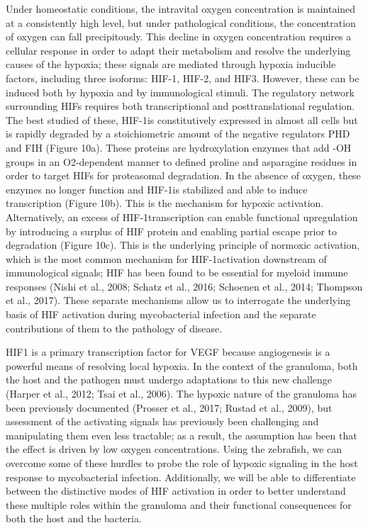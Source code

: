 Under homeostatic conditions, the intravital oxygen concentration is maintained at a consistently high level, but under pathological conditions, the concentration of oxygen can fall precipitously. This decline in oxygen concentration requires a cellular response in order to adapt their metabolism and resolve the underlying causes of the hypoxia; these signals are mediated through hypoxia inducible factors, including three isoforms: HIF-1\textalpha, HIF-2\textalpha, and HIF3\textalpha{}. However, these can be induced both by hypoxia and by immunological stimuli. The regulatory network surrounding HIFs requires both transcriptional and posttranslational regulation. The best studied of these, HIF-1\textalpha is constitutively expressed in almost all cells but is rapidly degraded by a stoichiometric amount of the negative regulators PHD and FIH (Figure 10a). These proteins are hydroxylation enzymes that add -OH groups in an O2-dependent manner to defined proline and asparagine residues in order to target HIFs for proteasomal degradation. In the absence of oxygen, these enzymes no longer function and HIF-1\textalpha is stabilized and able to induce transcription (Figure 10b). This is the mechanism for hypoxic activation. Alternatively, an excess of HIF-1\textalpha transcription can enable functional upregulation by introducing a surplus of HIF protein and enabling partial escape prior to degradation (Figure 10c). This is the underlying principle of normoxic activation, which is the most common mechanism for HIF-1\textalpha activation downstream of immunological signals; HIF has been found to be essential for myeloid immune responses (Nishi et al., 2008; Schatz et al., 2016; Schoenen et al., 2014; Thompson et al., 2017). These separate mechanisms allow us to interrogate the underlying basis of HIF activation during mycobacterial infection and the separate contributions of them to the pathology of disease. 

HIF1\textalpha{} is a primary transcription factor for VEGF because angiogenesis is a powerful means of resolving local hypoxia. In the context of the granuloma, both the host and the pathogen must undergo adaptations to this new challenge (Harper et al., 2012; Tsai et al., 2006). The hypoxic nature of the granuloma has been previously documented (Prosser et al., 2017; Rustad et al., 2009), but assessment of the activating signals has previously been challenging and manipulating them even less tractable; as a result, the assumption has been that the effect is driven by low oxygen concentrations. Using the zebrafish, we can overcome some of these hurdles to probe the role of hypoxic signaling in the host response to mycobacterial infection. Additionally, we will be able to differentiate between the distinctive modes of HIF activation in order to better understand these multiple roles within the granuloma and their functional consequences for both the host and the bacteria. 


